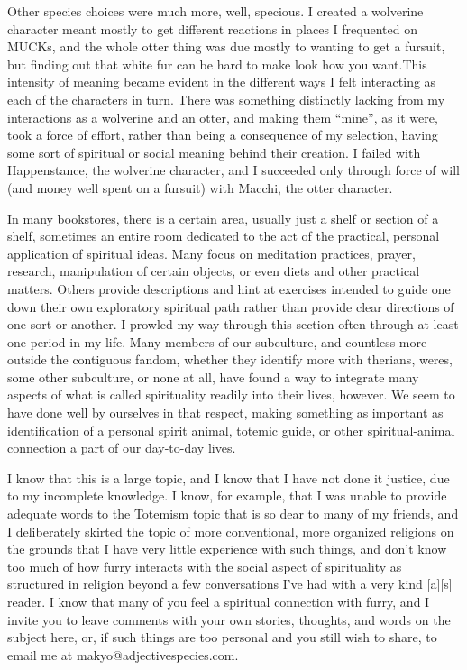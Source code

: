 Other species choices were much more, well, specious. I created a wolverine character meant mostly to get different reactions in places I frequented on MUCKs, and the whole otter thing was due mostly to wanting to get a fursuit, but finding out that white fur can be hard to make look how you want.This intensity of meaning became evident in the different ways I felt interacting as each of the characters in turn. There was something distinctly lacking from my interactions as a wolverine and an otter, and making them ``mine'', as it were, took a force of effort, rather than being a consequence of my selection, having some sort of spiritual or social meaning behind their creation. I failed with Happenstance, the wolverine character, and I succeeded only through force of will (and money well spent on a fursuit) with Macchi, the otter character.

In many bookstores, there is a certain area, usually just a shelf or section of a shelf, sometimes an entire room dedicated to the act of the practical, personal application of spiritual ideas. Many focus on meditation practices, prayer, research, manipulation of certain objects, or even diets and other practical matters. Others provide descriptions and hint at exercises intended to guide one down their own exploratory spiritual path rather than provide clear directions of one sort or another. I prowled my way through this section often through at least one period in my life. Many members of our subculture, and countless more outside the contiguous fandom, whether they identify more with therians, weres, some other subculture, or none at all, have found a way to integrate many aspects of what is called spirituality readily into their lives, however. We seem to have done well by ourselves in that respect, making something as important as identification of a personal spirit animal, totemic guide, or other spiritual-animal connection a part of our day-to-day lives.

I know that this is a large topic, and I know that I have not done it justice, due to my incomplete knowledge. I know, for example, that I was unable to provide adequate words to the Totemism topic that is so dear to many of my friends, and I deliberately skirted the topic of more conventional, more organized religions on the grounds that I have very little experience with such things, and don't know too much of how furry interacts with the social aspect of spirituality as structured in religion beyond a few conversations I've had with a very kind {[}a{]}{[}s{]} reader. I know that many of you feel a spiritual connection with furry, and I invite you to leave comments with your own stories, thoughts, and words on the subject here, or, if such things are too personal and you still wish to share, to email me at makyo@adjectivespecies.com.
